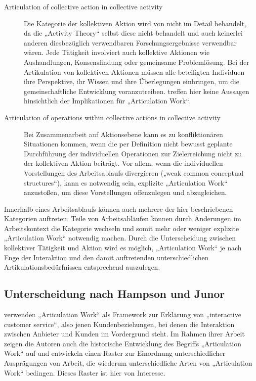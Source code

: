 \begin{description}
	\item[Articulation of collective action in collective activity] Die Kategorie der kollektiven Aktion wird von \citep{Fjuk97} nicht im Detail behandelt, da die „Activity Theory“ selbst diese nicht behandelt und auch keinerlei anderen diesbezüglich verwendbaren Forschungsergebnisse verwendbar wären. Jede Tätigkeit involviert auch kollektive Aktionen wie Aushandlungen, Konsensfindung oder gemeinsame Problemlösung. Bei der Artikulation von kollektiven Aktionen müssen alle beteiligten Individuen ihre Perspektive, ihr Wissen und ihre Überlegungen einbringen, um die gemeinschaftliche Entwicklung voranzutreiben. \citet{Fjuk97} treffen hier keine Aussagen hinsichtlich der Implikationen für „Articulation Work“.
	\item[Articulation of operations within collective actions in collective activity] Bei Zusammenarbeit auf Aktionsebene kann es zu konfliktionären Situationen kommen, wenn die per Definition nicht bewusst geplante Durchführung der individuellen Operationen zur Zielerreichung nicht zu der kollektiven Aktion beiträgt. Vor allem, wenn die individuellen Vorstellungen des Arbeitsablaufs divergieren („weak common conceptual structures“), kann es notwendig sein, explizite „Articulation Work“ anzustoßen, um diese Vorstellungen offenzulegen und abzugleichen.
\end{description}

Innerhalb eines Arbeitsablaufs können auch mehrere der hier beschriebenen Kategorien auftreten. Teile von Arbeitsabläufen können durch Änderungen im Arbeitskontext die Kategorie wechseln und somit mehr oder weniger explizite „Articulation Work“ notwendig machen. Durch die Unterscheidung zwischen kollektiver Tätigkeit und Aktion wird es möglich, „Articulation Work“ je nach Enge der Interaktion und den damit auftretenden unterschiedlichen Artikulationsbedürfnissen entsprechend auszulegen.

\subsection{Unterscheidung nach Hampson und Junor}
\label{sub:arten_hampson}

\citet{Hampson05} verwenden „Articulation Work“ als Framework zur Erklärung von „interactive customer service“, also jenen Kundenbeziehungen, bei denen die Interaktion zwischen Anbieter und Kunden im Vordergrund steht. Im Rahmen ihrer Arbeit zeigen die Autoren auch die historische Entwicklung des Begriffs „Articulation Work“ auf und entwickeln einen Raster zur Einordnung unterschiedlicher Ausprägungen von Arbeit, die wiederum unterschiedliche Arten von „Articulation Work“ bedingen. Dieses Raster ist hier von Interesse.

